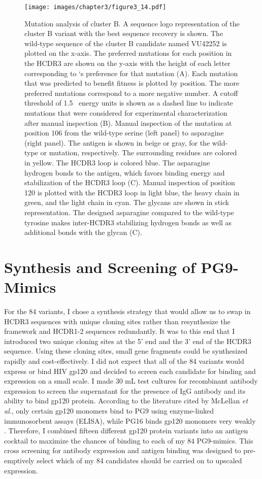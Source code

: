 \begin{figure}
   \centering
   \texttt{[image: images/chapter3/figure3\_14.pdf]} %
   \caption[Mutation Analysis of Cluster B]{Mutation analysis of cluster B. A sequence logo representation of the cluster B variant with the best sequence recovery is shown. The wild-type sequence of the cluster B candidate named VU42252 is plotted on the x-axis. The preferred mutations for each position in the HCDR3 are shown on the y-axis with the height of each letter corresponding to \rosetta`s preference for that mutation (A). Each mutation that was predicted to benefit fitness is plotted by position. The more preferred mutations correspond to a more negative number. A cutoff threshold of 1.5 \rosetta~energy units is shown as a dashed line to indicate mutations that were considered for experimental characterization after manual inspection (B). Manual inspection of the mutation at position 106 from the wild-type serine (left panel) to asparagine (right panel). The antigen is shown in beige or gray, for the wild-type or mutation, respectively. The surrounding residues are colored in yellow. The HCDR3 loop is colored blue. The asparagine hydrogen bonds to the antigen, which favors binding energy and stabilization of the HCDR3 loop (C). Manual inspection of position 120 is plotted with the HCDR3 loop in light blue, the heavy chain in green, and the light chain in cyan. The glycans are shown in stick representation. The designed asparagine compared to the wild-type tyrosine makes inter-HCDR3 stabilizing hydrogen bonds as well as additional bonds with the glycan (C).}
   \label{fig:figure3_14}
\end{figure}

\section{Synthesis and Screening of PG9-Mimics}
For the 84 variants, I chose a synthesis strategy that would allow us to swap in HCDR3 sequences with unique cloning sites rather than resynthesize the framework and HCDR1-2 sequences redundantly. It was to this end that I introduced two unique cloning sites at the 5' end and the 3' end of the HCDR3 sequence. Using these cloning sites, small gene fragments could be synthesized rapidly and cost-effectively.  I did not expect that all of the 84 variants would express or bind HIV gp120 and decided to screen each candidate for binding and expression on a small scale.  I made 30 mL test cultures for recombinant antibody expression to screen the supernatant for the presence of IgG antibody and its ability to bind gp120 protein. According to the literature cited by McLellan \textit{et al.}, only certain gp120 monomers bind to PG9 using enzyme-linked immunosorbent assays (ELISA), while PG16 binds gp120 monomers very weakly  \citep{McLellan:2011dg}. Therefore, I combined fifteen different gp120 protein variants into an antigen cocktail to maximize the chances of binding to each of my 84 PG9-mimics. This cross screening for antibody expression and antigen binding was designed to pre-emptively select which of my 84 candidates should be carried on to upscaled expression.

